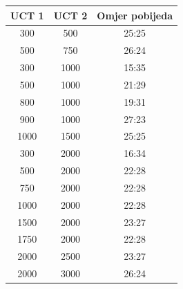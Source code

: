 \documentclass[20pt, a0paper, portrait, margin=0mm, innermargin=15mm,
     blockverticalspace=15mm, colspace=15mm, subcolspace=8mm]{tikzposter}
\begin{document}
\begin{columns}
\begin{subcolumns}
{\begin{center}
                    \begin{tabular}{||c c c||} 
                        \hline
                        \rowcolor{blue1}
                        UCT 1 & UCT 2 & Omjer pobijeda \\ [0.5ex] 
                        \hline\hline
                        \rowcolor{blue23}
                        300 & 500 & 25:25\\ 
                        \hline
                        \rowcolor{blue22}
                        500 & 750 & 26:24\\
                        \hline
                        \rowcolor{blue23}
                        300 & 1000 & 15:35\\
                        \hline
                        \rowcolor{blue22}
                        500 & 1000 & 21:29\\
                        \hline
                        \rowcolor{blue23}
                        800 & 1000 & 19:31\\
                        \hline
                        \rowcolor{blue22}
                        900 & 1000 & 27:23\\
                        \hline
                        \rowcolor{blue23}
                        1000 & 1500 & 25:25\\
                        \hline
                        \rowcolor{blue22}
                        300 & 2000 & 16:34\\
                        \hline
                        \rowcolor{blue23}
                        500 & 2000 & 22:28\\
                        \hline
                        \rowcolor{blue22}
                        750 & 2000 & 22:28\\
                        \hline
                        \rowcolor{blue23}
                        1000 & 2000 & 22:28\\
                        \hline
                        \rowcolor{blue22}
                        1500 & 2000 & 23:27\\
                        \hline
                        \rowcolor{blue23}
                        1750 & 2000 & 22:28\\
                        \hline
                        \rowcolor{blue22}
                        2000 & 2500 & 23:27\\
                        \hline
                        \rowcolor{blue23}
                        2000 & 3000 & 26:24\\

\end{tabular}
\end{center}}
\end{subcolumns}
\end{columns}
\end{document}
